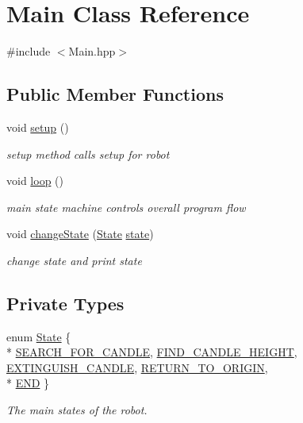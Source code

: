 \hypertarget{classMain}{\section{Main Class Reference}
\label{classMain}
}


{\ttfamily \#include $<$Main.\-hpp$>$}

\subsection*{Public Member Functions}
\begin{DoxyCompactItemize}
\item 
void \hyperlink{classMain_ab93af44e220d33016f01ed1b70612899}{setup} ()
\begin{DoxyCompactList}\small\item\em setup method calls setup for robot \end{DoxyCompactList}\item 
void \hyperlink{classMain_ac061692135a219ec5b7a8211c4e26ed6}{loop} ()
\begin{DoxyCompactList}\small\item\em main state machine controls overall program flow \end{DoxyCompactList}\item 
void \hyperlink{classMain_a2c24ed69c03010e24c109b7b4d59eca1}{change\-State} (\hyperlink{classMain_a551231243a758b95cf29d8ed2b7508da}{State} \hyperlink{classMain_a8b4ada43c3c3720b177018191ac6ee90}{state})
\begin{DoxyCompactList}\small\item\em change state and print state \end{DoxyCompactList}\end{DoxyCompactItemize}
\subsection*{Private Types}
\begin{DoxyCompactItemize}
\item 
enum \hyperlink{classMain_a551231243a758b95cf29d8ed2b7508da}{State} \{ \\*
\hyperlink{classMain_a551231243a758b95cf29d8ed2b7508daa9229c9e5dce20fda7fd5bbd54799fb32}{S\-E\-A\-R\-C\-H\-\_\-\-F\-O\-R\-\_\-\-C\-A\-N\-D\-L\-E}, 
\hyperlink{classMain_a551231243a758b95cf29d8ed2b7508daab2b9975fcdb8d0d79230156c24adf5b4}{F\-I\-N\-D\-\_\-\-C\-A\-N\-D\-L\-E\-\_\-\-H\-E\-I\-G\-H\-T}, 
\hyperlink{classMain_a551231243a758b95cf29d8ed2b7508daaf335b92cf0219a9b661613556bbe96b6}{E\-X\-T\-I\-N\-G\-U\-I\-S\-H\-\_\-\-C\-A\-N\-D\-L\-E}, 
\hyperlink{classMain_a551231243a758b95cf29d8ed2b7508daa3ff87a64146af251296a5ce0a05e923d}{R\-E\-T\-U\-R\-N\-\_\-\-T\-O\-\_\-\-O\-R\-I\-G\-I\-N}, 
\\*
\hyperlink{classMain_a551231243a758b95cf29d8ed2b7508daa6c2f5ff7b13123b1b782ac3664f20087}{E\-N\-D}
 \}
\begin{DoxyCompactList}\small\item\em The main states of the robot. \end{DoxyCompactList}\end{DoxyCompactItemize}
